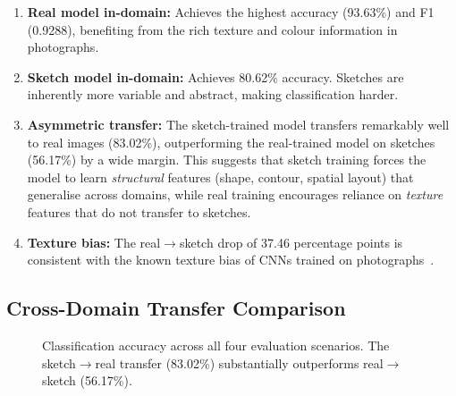 \documentclass[12pt, a4paper]{article}
\begin{document}
\begin{enumerate}[leftmargin=*]
    \item \textbf{Real model in-domain:} Achieves the highest accuracy
          (93.63\%) and F1 (0.9288), benefiting from the rich texture and
          colour information in photographs.
    \item \textbf{Sketch model in-domain:} Achieves 80.62\% accuracy.  Sketches
          are inherently more variable and abstract, making classification
          harder.
    \item \textbf{Asymmetric transfer:} The sketch-trained model transfers
          remarkably well to real images (83.02\%), outperforming the
          real-trained model on sketches (56.17\%) by a wide margin.  This
          suggests that sketch training forces the model to learn
          \emph{structural} features (shape, contour, spatial layout) that
          generalise across domains, while real training encourages reliance on
          \emph{texture} features that do not transfer to sketches.
    \item \textbf{Texture bias:} The real$\to$sketch drop of 37.46 percentage
          points is consistent with the known texture bias of CNNs trained on
          photographs~\cite{geirhos2019texture}.
\end{enumerate}

\subsection{Cross-Domain Transfer Comparison}

\begin{figure}[H]
\centering
{}
\caption{Classification accuracy across all four evaluation scenarios.  The
sketch$\to$real transfer (83.02\%) substantially outperforms real$\to$sketch
(56.17\%).}
\label{fig:eval_bar}
\end{figure}
\end{document}
